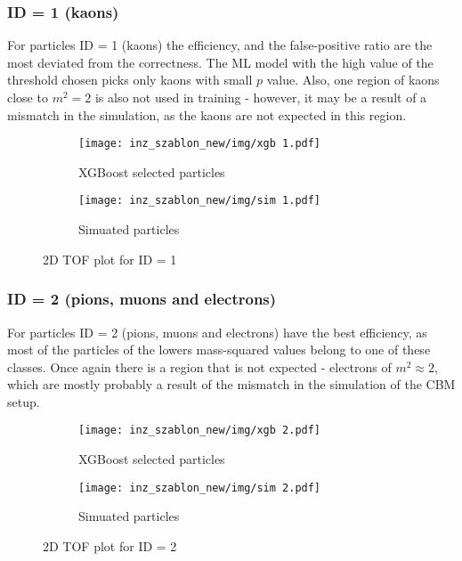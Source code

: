 \subsubsection{ID = 1 (kaons)}
For particles ID = 1 (kaons) the efficiency, and the false-positive ratio are the most deviated from the correctness. The ML model with the high value of the threshold chosen picks only kaons with small $p$ value. Also, one region of kaons close to $m^2 = 2$ is also not used in training - however, it may be a result of a mismatch in the simulation, as the kaons are not expected in this region.
\begin{figure}[H]
 \centering
    \begin{subfigure}[b]{0.7\linewidth} 
        \centering
        \texttt{[image: inz\_szablon\_new/img/xgb 1.pdf]}
        \caption{XGBoost selected particles}
        \vspace{0.3cm}
    \end{subfigure}
     \hfill
       \begin{subfigure}[b]{0.7\linewidth}
        \centering
        \texttt{[image: inz\_szablon\_new/img/sim 1.pdf]}
        \caption{Simuated particles}
        \vspace{0.3cm}
    \end{subfigure}
    \caption{2D TOF plot for ID = 1}
\end{figure}
\clearpage

\subsubsection{ID = 2 (pions, muons and electrons)}
For particles ID = 2 (pions, muons and electrons) have the best efficiency, as most of the particles of the lowers mass-squared values belong to one of these classes. Once again there is a region that is not expected - electrons of $m^2 \approx 2$, which are mostly probably a result of the mismatch in the simulation of the CBM setup.
\begin{figure}[H]
 \centering
    \begin{subfigure}[b]{0.7\linewidth} 
        \centering
        \texttt{[image: inz\_szablon\_new/img/xgb 2.pdf]}
        \caption{XGBoost selected particles}
        \vspace{0.3cm}
    \end{subfigure}
     \hfill
       \begin{subfigure}[b]{0.7\linewidth}
        \centering
        \texttt{[image: inz\_szablon\_new/img/sim 2.pdf]}
        \caption{Simuated particles}
        \vspace{0.3cm}
    \end{subfigure}
    \caption{2D TOF plot for ID = 2}
\end{figure}
\clearpage

